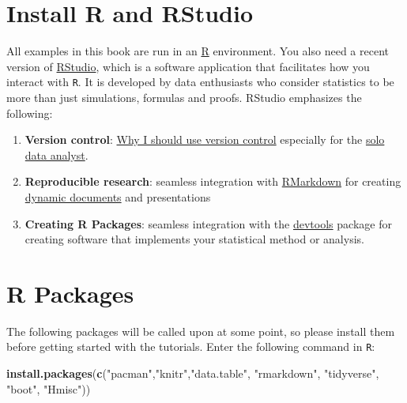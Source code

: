\documentclass[]{book}
\makeatletter
\newenvironment{Shaded}{\begin{snugshade}}{\end{snugshade}}
\newcommand{\KeywordTok}[1]{\textcolor[rgb]{0.13,0.29,0.53}{\textbf{#1}}}
\newcommand{\StringTok}[1]{\textcolor[rgb]{0.31,0.60,0.02}{#1}}
\newcommand{\NormalTok}[1]{#1}
\newenvironment{kframe}{%
\medskip{}
\setlength{\fboxsep}{.8em}
 \def\at@end@of@kframe{}%
 \ifinner\ifhmode%
  \def\at@end@of@kframe{\end{minipage}}%
  \begin{minipage}{\columnwidth}%
 \fi\fi%
 \def\FrameCommand##1{\hskip\@totalleftmargin \hskip-\fboxsep
 \colorbox{shadecolor}{##1}\hskip-\fboxsep
     \hskip-\linewidth \hskip-\@totalleftmargin \hskip\columnwidth}%
 \MakeFramed {\advance\hsize-\width
   \@totalleftmargin\z@ \linewidth\hsize
   \@setminipage}}%
 {\par\unskip\endMakeFramed%
 \at@end@of@kframe}
\renewenvironment{Shaded}{\begin{kframe}}{\end{kframe}}
\theoremstyle{definition}
\theoremstyle{definition}
\theoremstyle{definition}
\theoremstyle{remark}
\makeatother
\begin{document}
\section*{Install R and RStudio}\label{install-r-and-rstudio}

All examples in this book are run in an
\href{https://cran.r-project.org/}{R} environment. You also need a
recent version of
\href{https://www.rstudio.com/products/rstudio/download/preview/}{RStudio},
which is a software application that facilitates how you interact with
\texttt{R}. It is developed by data enthusiasts who consider statistics
to be more than just simulations, formulas and proofs. RStudio
emphasizes the following:

\begin{enumerate}
\def\labelenumi{\arabic{enumi}.}
\item
  \textbf{Version control}:
  \href{http://stackoverflow.com/questions/1408450/why-should-i-use-version-control}{Why
  I should use version control} especially for the
  \href{http://stackoverflow.com/questions/2712421/r-and-version-control-for-the-solo-data-analyst}{solo
  data analyst}.
\item
  \textbf{Reproducible research}: seamless integration with
  \href{http://rmarkdown.rstudio.com/}{RMarkdown} for creating
  \href{http://yihui.name/knitr/}{dynamic documents} and presentations
\item
  \textbf{Creating R Packages}: seamless integration with the
  \href{https://github.com/hadley/devtools}{devtools} package for
  creating software that implements your statistical method or analysis.
\end{enumerate}

\section*{R Packages}\label{r-packages}

The following packages will be called upon at some point, so please
install them before getting started with the tutorials. Enter the
following command in \texttt{R}:

\begin{Shaded}
\begin{Highlighting}[]
\KeywordTok{install.packages}\NormalTok{(}\KeywordTok{c}\NormalTok{(}\StringTok{"pacman"}\NormalTok{,}\StringTok{"knitr"}\NormalTok{,}\StringTok{"data.table"}\NormalTok{, }\StringTok{"rmarkdown"}\NormalTok{, }\StringTok{"tidyverse"}\NormalTok{, }\StringTok{"boot"}\NormalTok{, }\StringTok{"Hmisc"}\NormalTok{))}
\end{Highlighting}
\end{Shaded}
\end{document}
